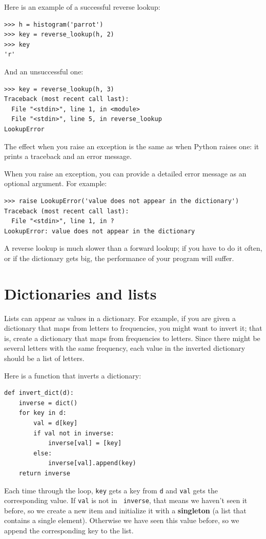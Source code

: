 \documentclass[10pt]{book}
\begin{document}
Here is an example of a successful reverse lookup:

\begin{verbatim}
>>> h = histogram('parrot')
>>> key = reverse_lookup(h, 2)
>>> key
'r'
\end{verbatim}
%
And an unsuccessful one:

\begin{verbatim}
>>> key = reverse_lookup(h, 3)
Traceback (most recent call last):
  File "<stdin>", line 1, in <module>
  File "<stdin>", line 5, in reverse_lookup
LookupError
\end{verbatim}
%
The effect when you raise an exception is the same as when
Python raises one: it prints a traceback and an error message.

When you raise an exception, you can provide a detailed error message as an optional argument.  For example:

\begin{verbatim}
>>> raise LookupError('value does not appear in the dictionary')
Traceback (most recent call last):
  File "<stdin>", line 1, in ?
LookupError: value does not appear in the dictionary
\end{verbatim}
%
A reverse lookup is much slower than a forward lookup; if you
have to do it often, or if the dictionary gets big, the performance
of your program will suffer.


\section{Dictionaries and lists}
\label{invert}

Lists can appear as values in a dictionary.  For example, if you
are given a dictionary that maps from letters to frequencies, you
might want to invert it; that is, create a dictionary that maps
from frequencies to letters.  Since there might be several letters
with the same frequency, each value in the inverted dictionary
should be a list of letters.

Here is a function that inverts a dictionary:

\begin{verbatim}
def invert_dict(d):
    inverse = dict()
    for key in d:
        val = d[key]
        if val not in inverse:
            inverse[val] = [key]
        else:
            inverse[val].append(key)
    return inverse
\end{verbatim}
%
Each time through the loop, {\tt key} gets a key from {\tt d} and
{\tt val} gets the corresponding value.  If {\tt val} is not in {\tt
  inverse}, that means we haven't seen it before, so we create a new
item and initialize it with a {\bf singleton} (a list that contains a
single element).  Otherwise we have seen this value before, so we
append the corresponding key to the list.  
\end{document}
